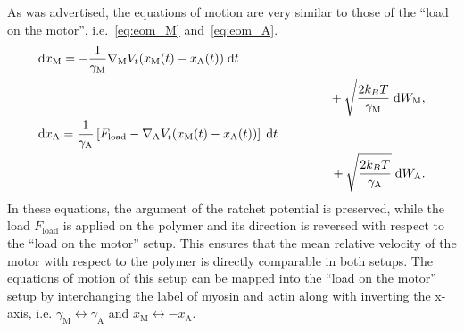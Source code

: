 \documentclass[aps,pre,twocolumn,showpacs,showkeys,superscriptaddress,floatfix]{revtex4-1}
\newcommand{\rmd}{{\mathrm d}}
\begin{document}
As was advertised, the equations of motion are very similar to those of the ``load on the motor'', i.e.~\eqref{eq:eom_M} and~\eqref{eq:eom_A}.
\begin{align}
&\begin{multlined}[b][.9\linewidth]
\rmd x_\text{M} = 
- \frac{1}{\gamma_\text{M}} \nabla_\text{M} V_t(x_\text{M}(t) - x_\text{A}(t)) \; \rmd t 
\\ 
+ \sqrt{ \frac{2 k_B T}{\gamma_\text{M}} } \; \rmd W_\text{M} ,
\end{multlined}
\label{eq:eom_M_lp} \\
&\begin{multlined}[b][.9\linewidth]
\rmd x_\text{A} = 
\frac{1}{\gamma_\text{A}} \left[ F_\text{load} - \nabla_\text{A} V_t(x_\text{M}(t) - x_\text{A}(t)) \right] \; \rmd t 
\\
+ \sqrt{ \frac{2 k_B T}{\gamma_\text{A}} } \; \rmd W_\text{A} .
\end{multlined}
\label{eq:eom_A_lp}
\end{align}
In these equations, the argument of the ratchet potential is preserved, 
while the load $F_\text{load}$ is applied on the polymer and its direction is reversed with respect to the ``load on the motor'' setup. 
This ensures that the mean relative velocity of the motor with respect to the polymer is directly comparable in both setups. 
The equations of motion of this setup can be mapped into the ``load on the motor'' setup by interchanging the label of myosin and actin 
along with inverting the x-axis, 
i.e. $\gamma_\text{M}\leftrightarrow\gamma_\text{A}$ and $x_\text{M}\leftrightarrow - x_\text{A}$.
\end{document}
